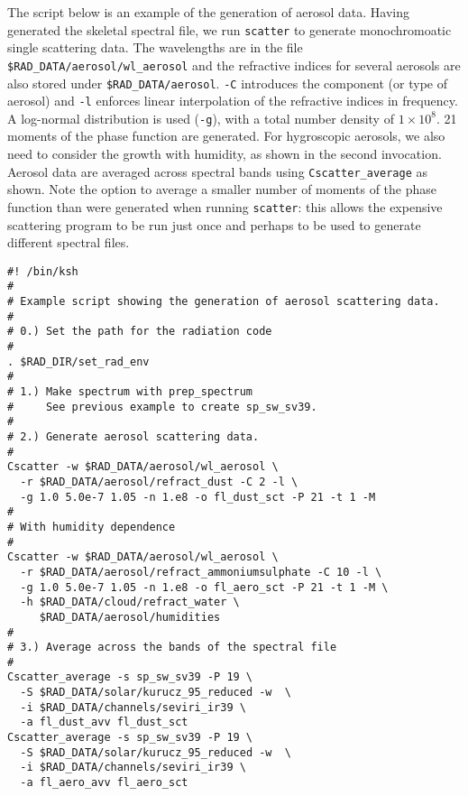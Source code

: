 The script below is an example of the generation of aerosol data.
Having generated the skeletal spectral file, we run {\tt scatter} to
generate monochromoatic single scattering data. The wavelengths are
in the file {\tt \$RAD\_DATA/aerosol/wl\_aerosol} and the refractive
indices for several aerosols are also stored under {\tt \$RAD\_DATA/aerosol}.
{\tt -C} introduces the
component (or type of aerosol) and {\tt -l} enforces linear interpolation
of the refractive indices in frequency. A log-normal distribution is 
used ({\tt -g}), with a total number density of $1\times 10^8$. 21
moments of the phase function are generated. For hygroscopic aerosols,
we also need to consider the growth with humidity, as shown in the
second invocation. Aerosol data are averaged across spectral bands
using {\tt Cscatter\_average} as shown. Note the option to average
a smaller number of moments of the phase function than were generated
when running {\tt scatter}: this allows the expensive scattering 
program to be run just once and perhaps to be used to generate different
spectral files.

{\small
\begin{verbatim}
#! /bin/ksh
#
# Example script showing the generation of aerosol scattering data.
#
# 0.) Set the path for the radiation code
#
. $RAD_DIR/set_rad_env
#
# 1.) Make spectrum with prep_spectrum
#     See previous example to create sp_sw_sv39.
#
# 2.) Generate aerosol scattering data.
#
Cscatter -w $RAD_DATA/aerosol/wl_aerosol \
  -r $RAD_DATA/aerosol/refract_dust -C 2 -l \
  -g 1.0 5.0e-7 1.05 -n 1.e8 -o fl_dust_sct -P 21 -t 1 -M
#
# With humidity dependence
#
Cscatter -w $RAD_DATA/aerosol/wl_aerosol \
  -r $RAD_DATA/aerosol/refract_ammoniumsulphate -C 10 -l \
  -g 1.0 5.0e-7 1.05 -n 1.e8 -o fl_aero_sct -P 21 -t 1 -M \
  -h $RAD_DATA/cloud/refract_water \
     $RAD_DATA/aerosol/humidities
#
# 3.) Average across the bands of the spectral file
#
Cscatter_average -s sp_sw_sv39 -P 19 \
  -S $RAD_DATA/solar/kurucz_95_reduced -w  \
  -i $RAD_DATA/channels/seviri_ir39 \
  -a fl_dust_avv fl_dust_sct
Cscatter_average -s sp_sw_sv39 -P 19 \
  -S $RAD_DATA/solar/kurucz_95_reduced -w  \
  -i $RAD_DATA/channels/seviri_ir39 \
  -a fl_aero_avv fl_aero_sct
\end{verbatim}
}
